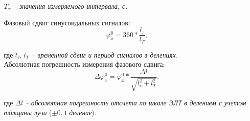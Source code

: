 \hspace{5mm} $ T_x $ \textit{-- значения измеряемого интервала, с.}

\vspace{4mm}

Фазовый сдвиг синусоидальных сигналов:
\begin{equation}
\label{equation:eq3}
	\varphi^{0}_x = 360\ast\dfrac{l_\tau}{l_T}, 
\end{equation}

где $ l_\tau $, $ l_T $ \textit{-- временной сдвиг и период сигналов в делениях.} \\

Абсолютная погрешность измерения фазового сдвига:
\begin{equation}
\label{equation:eq4}
	\Delta \varphi^{0}_x = \varphi^{0}_x \ast \dfrac{\Delta l}{\sqrt{l_{\tau}^2 + l^2_T}}, 
\end{equation}

где $ \Delta l $ \textit{-- абсолютная погрешность отсчета по шкале ЭЛТ в делением с учетом толщины луча} ($ \pm0,1 $ \textit{деление}). \\

\clearpage
